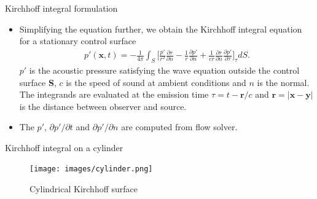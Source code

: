 \documentclass[10pt, aspectratio=169]{beamer}
\begin{document}
\begin{frame}{Kirchhoff integral formulation}
	\begin{itemize}
		\item Simplifying the equation further, we obtain the Kirchhoff integral equation for a stationary control surface
		\begin{equation}
			\begin{split}
				p'(\mathbf{x}, t) = -\frac{1}{4\pi}\int_{S}\Big[  \frac{p'}{r^{2}}\frac{\partial r}{\partial n} - \frac{1}{r}\frac{\partial p'}{\partial n} + \frac{1}{c r}\frac{\partial r}{\partial n}\frac{\partial p'}{\partial \tau} \Big]_{\tau} dS.
			\end{split} 
		\end{equation}
		$p'$ is the acoustic pressure satisfying the wave equation outside the control surface \textbf{S}, $c$ is the speed of sound at ambient conditions and $n$ is the normal.
		The integrands are evaluated at the emission time $\tau = t - \mathbf{r}/c$ and $\mathbf{r}= |\mathbf{x} - \mathbf{y}|$ is the distance between observer and source.
		\item The $p'$, ${\partial p'}/{\partial t}$ and ${\partial p'}/{\partial n}$ are computed from flow solver.
	\end{itemize}
\end{frame}

\begin{frame}{Kirchhoff integral on a cylinder}
	\begin{figure}
		\centering
		\texttt{[image: images/cylinder.png]}
		\caption{Cylindrical Kirchhoff surface}
	\end{figure}
\end{frame}
\end{document}
